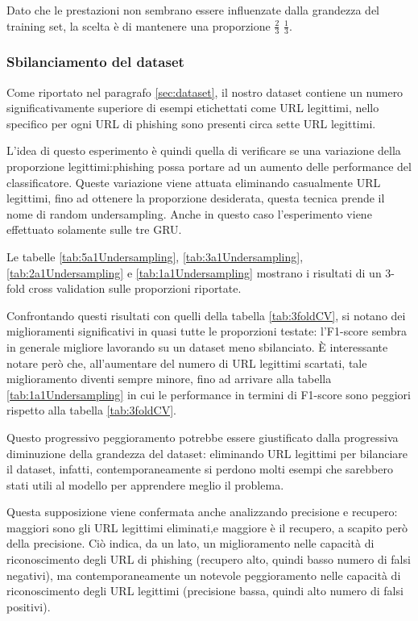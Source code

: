 \documentclass[../../main.tex]{subfiles}
\begin{document}
    Dato che le prestazioni non sembrano essere influenzate dalla grandezza del training set, la scelta è di mantenere una proporzione $\frac{2}{3}$ $\frac{1}{3}$.

    \subsubsection{Sbilanciamento del dataset}
    Come riportato nel paragrafo \ref{sec:dataset}, il nostro dataset contiene un numero significativamente superiore di esempi etichettati come URL legittimi, nello specifico per ogni URL di phishing sono presenti circa sette URL legittimi.

    L'idea di questo esperimento è quindi quella di verificare se una variazione della proporzione legittimi:phishing possa portare ad un aumento delle performance del classificatore. Queste variazione viene attuata eliminando  casualmente URL legittimi, fino ad ottenere la proporzione desiderata, questa tecnica prende il nome di random undersampling. Anche in questo caso l'esperimento viene effettuato solamente sulle tre GRU.

    Le tabelle \ref{tab:5a1Undersampling}, \ref{tab:3a1Undersampling}, \ref{tab:2a1Undersampling} e \ref{tab:1a1Undersampling} mostrano i risultati di un 3-fold cross validation sulle proporzioni riportate.

    Confrontando questi risultati con quelli della tabella \ref{tab:3foldCV}, si notano dei miglioramenti significativi in quasi tutte le proporzioni testate: l'F1-score sembra in generale migliore lavorando su un dataset meno sbilanciato. È interessante notare però che, all'aumentare del numero di URL legittimi scartati, tale miglioramento diventi sempre minore, fino ad arrivare alla tabella \ref{tab:1a1Undersampling} in cui le performance in termini di F1-score sono peggiori rispetto alla tabella \ref{tab:3foldCV}.

    Questo progressivo peggioramento potrebbe essere giustificato dalla progressiva diminuzione della grandezza del dataset: eliminando URL legittimi per bilanciare il dataset, infatti, contemporaneamente si perdono molti esempi che sarebbero stati utili al modello per apprendere meglio il problema.

    Questa supposizione viene confermata anche analizzando precisione e recupero: maggiori sono gli URL legittimi eliminati,e maggiore è il recupero, a scapito però della precisione. Ciò indica, da un lato, un miglioramento nelle capacità di riconoscimento degli URL di phishing (recupero alto, quindi basso numero di falsi negativi), ma contemporaneamente un notevole peggioramento nelle capacità di riconoscimento degli URL legittimi (precisione bassa, quindi alto numero di falsi positivi).
\end{document}
